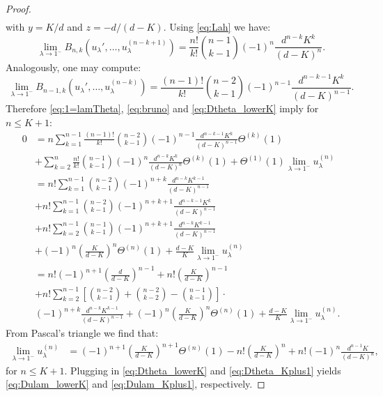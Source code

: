 \documentclass[12pt]{report}
\begin{document}
\begin{proof}
\begin{align*}
\end{align*}
with $y=K/d$ and $z=-d/(d-K)$.
Using \eqref{eq:Lah} we have:
$$
\lim_{\lambda \rightarrow 1^-} B_{n,k}(u_\lambda',\dots,u_{\lambda}^{(n-k+1)})
=
\frac{n!}{k!} \binom{n-1}{k-1} (-1)^n \frac{d^{n-k} K^k}{(d-K)^n}.
$$
Analogously, one may compute:
$$
\lim_{\lambda \rightarrow 1^-} B_{n-1,k}(u_\lambda',\dots,u_{\lambda}^{(n-k)})
=
\frac{(n-1)!}{k!} \binom{n-2}{k-1} (-1)^{n-1} \frac{d^{n-k-1} K^k}{(d-K)^{n-1}}.
$$
Therefore \eqref{eq:1=lamTheta}, \eqref{eq:bruno} and \eqref{eq:Dtheta_lowerK} imply for $n \leq K+1$:
\begin{align*}
0
&=n \sum_{k=1}^{n-1} \frac{(n-1)!}{k!} \binom{n-2}{k-1} (-1)^{n-1} \frac{d^{n-k-1} K^k}{(d-K)^{n-1}} \Theta^{(k)}(1)\\
& +\sum_{k=2}^n \frac{n!}{k!} \binom{n-1}{k-1} (-1)^n \frac{d^{n-k} K^k}{(d-K)^n} \Theta^{(k)}(1) +\Theta^{(1)}(1) \lim_{\lambda \rightarrow 1^-} u_{\lambda}^{(n)}\\
&= n! \sum_{k=1}^{n-1} \binom{n-2}{k-1} (-1)^{n+k} \frac{d^{n-k} K^{k-1}}{(d-K)^{n-1}}\\
&+ n! \sum_{k=1}^{n-1} \binom{n-2}{k-1} (-1)^{n+k+1}\frac{d^{n-k-1} K^{k}}{(d-K)^{n-1}}\\
&+ n! \sum_{k=2}^{n-1} \binom{n-1}{k-1} (-1)^{n+k+1} \frac{d^{n-k} K^{k-1}}{(d-K)^{n-1}}\\
&+ (-1)^n \left(\frac{K}{d-K}\right)^n \Theta^{(n)}(1) + \frac{d-K}{K} \lim_{\lambda \rightarrow 1^-} u_\lambda^{(n)}\\
&=n! (-1)^{n+1} \left( \frac{d}{d-K} \right)^{n-1} + n! \left( \frac{K}{d-K} \right)^{n-1}\\
&+ n! \sum_{k=2}^{n-1} \left[ \binom{n-2}{k-1} + \binom{n-2}{k-2} - \binom{n-1}{k-1} \right] \cdot \\
&(-1)^{n+k} \frac{d^{n-k} K^{k-1}}{(d-K)^{n-1}}+(-1)^n \left( \frac{K}{d-K} \right)^n \Theta^{(n)}(1) + \frac{d-K}{K} \lim_{\lambda \rightarrow 1^-} u_{\lambda}^{(n)}.
\end{align*}
From Pascal's triangle we find that:
\begin{align*}
\lim_{\lambda\rightarrow 1^-} u_\lambda^{(n)}
&=
(-1)^{n+1} \left( \frac{K}{d-K} \right)^{n+1} \Theta^{(n)}(1) -n! \left( \frac{K}{d-K} \right)^n + n! (-1)^n \frac{d^{n-1} K}{(d-K)^n},
\end{align*}
for $n \leq K+1$.
Plugging in 
 \eqref{eq:Dtheta_lowerK} and \eqref{eq:Dtheta_Kplus1} yields
  \eqref{eq:Dulam_lowerK} and \eqref{eq:Dulam_Kplus1}, respectively.
\end{proof}
\end{document}
